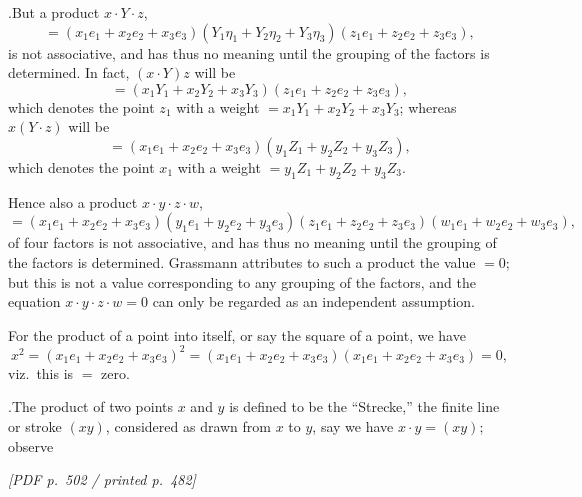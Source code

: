 \documentclass[11pt]{article}
\begin{document}
\medskip

.\quad But a product $x\cdot Y\cdot z$,
\[
= (x_{1}e_{1} + x_{2}e_{2} + x_{3}e_{3})(Y_{1}\eta_{1} + Y_{2}\eta_{2} + Y_{3}\eta_{3})(z_{1}e_{1} + z_{2}e_{2} + z_{3}e_{3}),
\]
is not associative, and has thus no meaning until the grouping of the factors is determined. In fact, $(x\cdot Y)z$ will be
\[
= (x_{1}Y_{1} + x_{2}Y_{2} + x_{3}Y_{3})(z_{1}e_{1} + z_{2}e_{2} + z_{3}e_{3}),
\]
which denotes the point $z_{1}$ with a weight $= x_{1}Y_{1} + x_{2}Y_{2} + x_{3}Y_{3}$; whereas $x(Y\cdot z)$ will be
\[
= (x_{1}e_{1} + x_{2}e_{2} + x_{3}e_{3})(y_{1}Z_{1} + y_{2}Z_{2} + y_{3}Z_{3}),
\]
which denotes the point $x_{1}$ with a weight $= y_{1}Z_{1} + y_{2}Z_{2} + y_{3}Z_{3}$.

\medskip

\noindent Hence also a product $x\cdot y\cdot z\cdot w$,
\[
= (x_{1}e_{1} + x_{2}e_{2} + x_{3}e_{3})(y_{1}e_{1} + y_{2}e_{2} + y_{3}e_{3})(z_{1}e_{1} + z_{2}e_{2} + z_{3}e_{3})(w_{1}e_{1} + w_{2}e_{2} + w_{3}e_{3}),
\]
of four factors is not associative, and has thus no meaning until the grouping of the factors is determined. Grassmann attributes to such a product the value $= 0$; but this is not a value corresponding to any grouping of the factors, and the equation $x\cdot y\cdot z\cdot w = 0$ can only be regarded as an independent assumption.

For the product of a point into itself, or say the square of a point, we have
\[
x^{2} = (x_{1}e_{1} + x_{2}e_{2} + x_{3}e_{3})^{2} = (x_{1}e_{1} + x_{2}e_{2} + x_{3}e_{3})(x_{1}e_{1} + x_{2}e_{2} + x_{3}e_{3}) = 0,
\]
viz.\ this is $=$ zero.

\medskip

.\quad The product of two points $x$ and $y$ is defined to be the ``Strecke,'' the finite line or stroke $(xy)$, considered as drawn from $x$ to $y$, say we have $x\cdot y = (xy)$; observe

\vfill
\noindent\textit{[PDF p.~502 / printed p.~482]}
\newpage
\end{document}
